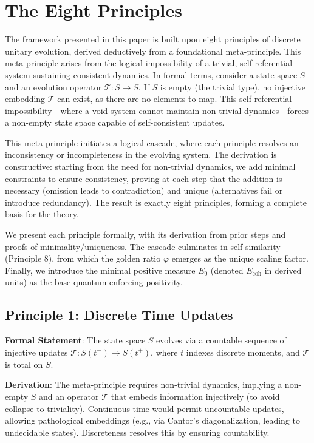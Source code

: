 \documentclass[twocolumn,prd,amsmath,amssymb,aps,superscriptaddress,nofootinbib]{revtex4-2}
\begin{document}
\section{The Eight Principles}
\label{sec:eight-principles}

The framework presented in this paper is built upon eight principles of discrete unitary evolution, derived deductively from a foundational meta-principle. This meta-principle arises from the logical impossibility of a trivial, self-referential system sustaining consistent dynamics. In formal terms, consider a state space $S$ and an evolution operator $\mathcal{T}: S \to S$. If $S$ is empty (the trivial type), no injective embedding $\mathcal{T}$ can exist, as there are no elements to map. This self-referential impossibility—where a void system cannot maintain non-trivial dynamics—forces a non-empty state space capable of self-consistent updates.

This meta-principle initiates a logical cascade, where each principle resolves an inconsistency or incompleteness in the evolving system. The derivation is constructive: starting from the need for non-trivial dynamics, we add minimal constraints to ensure consistency, proving at each step that the addition is necessary (omission leads to contradiction) and unique (alternatives fail or introduce redundancy). The result is exactly eight principles, forming a complete basis for the theory.

We present each principle formally, with its derivation from prior steps and proofs of minimality/uniqueness. The cascade culminates in self-similarity (Principle 8), from which the golden ratio $\varphi$ emerges as the unique scaling factor. Finally, we introduce the minimal positive measure $E_0$ (denoted $E_{\text{coh}}$ in derived units) as the base quantum enforcing positivity.

\subsection{Principle 1: Discrete Time Updates}
\label{subsec:principle-1}

\textbf{Formal Statement}: The state space $S$ evolves via a countable sequence of injective updates $\mathcal{T}: S(t^-) \to S(t^+)$, where $t$ indexes discrete moments, and $\mathcal{T}$ is total on $S$.

\textbf{Derivation}: The meta-principle requires non-trivial dynamics, implying a non-empty $S$ and an operator $\mathcal{T}$ that embeds information injectively (to avoid collapse to triviality). Continuous time would permit uncountable updates, allowing pathological embeddings (e.g., via Cantor's diagonalization, leading to undecidable states). Discreteness resolves this by ensuring countability.
\end{document}
